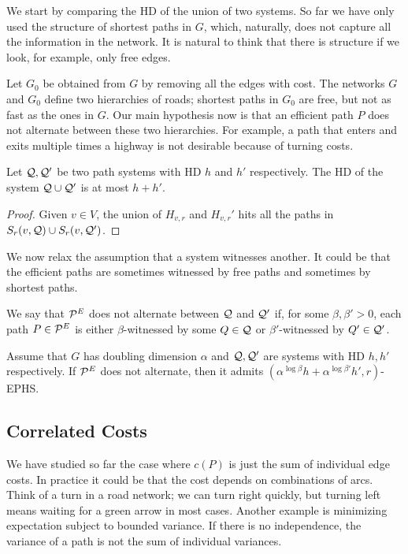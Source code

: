 
We start by comparing the HD of the union of two systems.
So far we have only used the structure of shortest paths in $G$, which, naturally, does not capture all the information in the network.
It is natural to think that there is structure if we look, for example, only free edges.

Let $G_0$ be obtained from $G$ by removing all the edges with cost.
The networks $G$ and $G_0$ define two hierarchies of roads; shortest paths in $G_0$ are free, but not as fast as the ones in $G$.
Our main hypothesis now is that an efficient path $P$ does not alternate between these two hierarchies.
For example, a path that enters and exits multiple times a highway is not desirable because of turning costs.

\begin{proposition}
Let $\mathcal{Q},\mathcal{Q}'$ be two path systems with HD $h$ and $h'$ respectively.
The HD of the system $\mathcal{Q}\cup\mathcal{Q}'$ is at most $h+h'$.
\end{proposition}
\begin{proof}
Given $v\in V$, the union of $H_{v,r}$ and $H_{v,r}'$ hits all the paths in $S_r(v,\mathcal{Q})\cup S_r(v,\mathcal{Q}')$.
\end{proof}

We now relax the assumption that a system witnesses another.
It could be that the efficient paths are sometimes witnessed by free paths and sometimes by shortest paths.

\begin{definition}
We say that $\mathcal{P}^E$ does not alternate between $\mathcal{Q}$ and $\mathcal{Q}'$ if, for some $\beta,\beta'>0$, each path $P\in\mathcal{P}^E$ is either $\beta$-witnessed by some $Q\in\mathcal{Q}$ or $\beta'$-witnessed by $Q'\in\mathcal{Q}'$.
\end{definition}

\begin{theorem}
Assume that $G$ has doubling dimension $\alpha$ and $\mathcal{Q},\mathcal{Q}'$ are systems with HD $h,h'$ respectively.
If $\mathcal{P}^E$ does not alternate, then it admits $(\alpha^{\log\beta}h+\alpha^{\log\beta'}h',r)$-EPHS.
\end{theorem}


\subsection{Correlated Costs}
We have studied so far the case where $c(P)$ is just the sum of individual edge costs.
In practice it could be that the cost depends on combinations of arcs.
Think of a turn in a road network; we can turn right quickly, but turning left means waiting for a green arrow in most cases.
Another example is minimizing expectation subject to bounded variance.
If there is no independence, the variance of a path is not the sum of individual variances.

